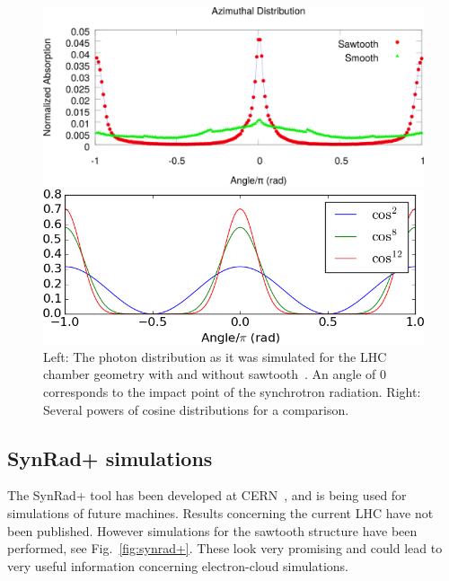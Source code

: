 \begin{figure}[tbh]
    \centering
    \begin{minipage}[c]{0.47\textwidth}
        \includegraphics[width=\textwidth]{../ss/photon_distribution_guillermo.png}
    \end{minipage}
    \hspace{0.5cm}
    \begin{minipage}[c]{0.47\textwidth}
        \includegraphics[width=\textwidth]{../plots/cosine_power.png}
    \end{minipage}
    \caption{Left: The photon distribution as it was simulated for the LHC chamber geometry with and without sawtooth~\cite{guillermo}.
    An angle of 0 corresponds to the impact point of the synchrotron radiation.
    Right: Several powers of cosine distributions for a comparison.}
    \label{fig:guillermo}
\end{figure}

\subsection{SynRad+ simulations}

The SynRad+ tool has been developed at CERN~\cite{synrad+}, and is being used for simulations of future machines.
Results concerning the current LHC have not been published.
However simulations for the sawtooth structure have been performed, see Fig.~\ref{fig:synrad+}.
These look very promising and could lead to very useful information concerning electron-cloud simulations.

